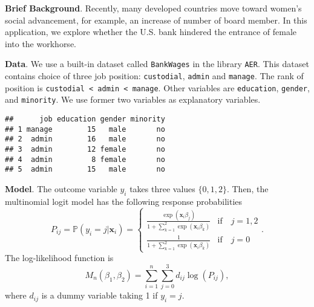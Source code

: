 \documentclass[
  12pt,
]{article}
\newenvironment{Shaded}{\begin{snugshade}}{\end{snugshade}}
\newcommand{\DataTypeTok}[1]{\textcolor[rgb]{0.13,0.29,0.53}{#1}}
\newcommand{\DecValTok}[1]{\textcolor[rgb]{0.00,0.00,0.81}{#1}}
\newcommand{\KeywordTok}[1]{\textcolor[rgb]{0.13,0.29,0.53}{\textbf{#1}}}
\newcommand{\NormalTok}[1]{#1}
\newcommand{\OperatorTok}[1]{\textcolor[rgb]{0.81,0.36,0.00}{\textbf{#1}}}
\newcommand{\StringTok}[1]{\textcolor[rgb]{0.31,0.60,0.02}{#1}}
\begin{document}
\textbf{Brief Background}. Recently, many developed countries move
toward women's social advancement, for example, an increase of number of
board member. In this application, we explore whether the U.S. bank
hindered the entrance of female into the workhorse.

\textbf{Data}. We use a built-in dataset called \texttt{BankWages} in
the library \texttt{AER}. This dataset contains choice of three job
position: \texttt{custodial}, \texttt{admin} and \texttt{manage}. The
rank of position is
\texttt{custodial\ \textless{}\ admin\ \textless{}\ manage}. Other
variables are \texttt{education}, \texttt{gender}, and
\texttt{minority}. We use former two variables as explanatory variables.

\begin{Shaded}
\end{Shaded}

\begin{verbatim}
##      job education gender minority
## 1 manage        15   male       no
## 2  admin        16   male       no
## 3  admin        12 female       no
## 4  admin         8 female       no
## 5  admin        15   male       no
\end{verbatim}

\textbf{Model}. The outcome variable \(y_i\) takes three values
\(\{0, 1, 2\}\). Then, the multinomial logit model has the following
response probabilities \begin{equation*}
  P_{ij} = \mathbb{P}(y_i = j | \mathbf{x}_i) =
  \begin{cases}
    \frac{\exp(\mathbf{x}_i \beta_j)}{1 + \sum_{k=1}^2 \exp(\mathbf{x}_i \beta_k)} &\text{if}\quad j = 1, 2  \\
    \frac{1}{1 + \sum_{k=1}^2 \exp(\mathbf{x}_i \beta_k)}  &\text{if}\quad j = 0
  \end{cases}.
\end{equation*} The log-likelihood function is \begin{equation*}
  M_n(\beta_1, \beta_2) = \sum_{i=1}^n \sum_{j=0}^3 d_{ij} \log (P_{ij}),
\end{equation*} where \(d_{ij}\) is a dummy variable taking 1 if
\(y_i = j\).
\end{document}

